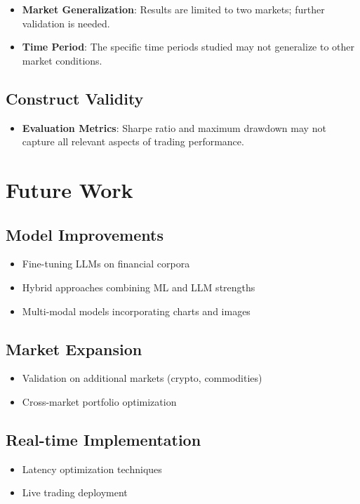 \begin{itemize}
    \item \textbf{Market Generalization}: Results are limited to two markets; further validation is needed.
    \item \textbf{Time Period}: The specific time periods studied may not generalize to other market conditions.
\end{itemize}

\subsection{Construct Validity}

\begin{itemize}
    \item \textbf{Evaluation Metrics}: Sharpe ratio and maximum drawdown may not capture all relevant aspects of trading performance.
\end{itemize}

\section{Future Work}

\subsection{Model Improvements}

\begin{itemize}
    \item Fine-tuning LLMs on financial corpora
    \item Hybrid approaches combining ML and LLM strengths
    \item Multi-modal models incorporating charts and images
\end{itemize}

\subsection{Market Expansion}

\begin{itemize}
    \item Validation on additional markets (crypto, commodities)
    \item Cross-market portfolio optimization
\end{itemize}

\subsection{Real-time Implementation}

\begin{itemize}
    \item Latency optimization techniques
    \item Live trading deployment
\end{itemize}